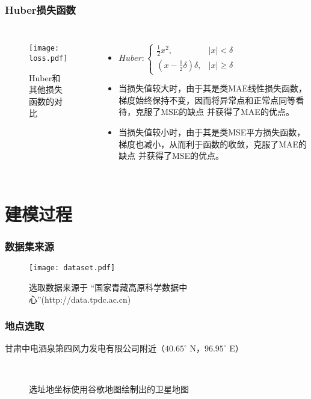 \documentclass[14pt, AutoFakeBold]{ppt}
\begin{document}
\begin{frame}
  \frametitle{Huber损失函数}
  \begin{columns}
    \begin{figure}[H]
      \centering
      \texttt{[image: loss.pdf]}
      \caption{Huber和其他损失函数的对比}
      \label{fig_loss}
    \end{figure}
      \begin{itemize}
      \item $Huber:
      \left\{\begin{matrix}
          \frac{1}{2}x^{2}, & \left | x  \right | < \delta\\
          (x - \frac1 2 \delta)\delta, & \left | x  \right | \geq \delta
      \end{matrix}\right.$
      \item 当损失值较大时，由于其是类MAE线性损失函数，
      梯度始终保持不变，因而将异常点和正常点同等看待，克服了MSE的缺点
      并获得了MAE的优点。
      \item 当损失值较小时，由于其是类MSE平方损失函数，
      梯度也减小，从而利于函数的收敛，克服了MAE的缺点
      并获得了MSE的优点。
    \end{itemize}
  \end{columns}
\end{frame}

\section{建模过程}

\begin{frame}
  \frametitle{数据集来源}
  \begin{figure}[H]
    \centering
    \texttt{[image: dataset.pdf]}
    \caption{选取数据来源于\cite{8028b944-daaa-4511-8769-965612652c49}
    \cite{37cab0ac-d066-4fb9-aa9c-1cf50d601096}
    “国家青藏高原科学数据中心”(http://data.tpdc.ac.cn)}
    \label{fig_dataset}
\end{figure}
\end{frame}

\begin{frame}
  \frametitle{地点选取}
  甘肃中电酒泉第四风力发电有限公司附近（$40.65^{\circ}$ N，$96.95^{\circ}$ E）
  \begin{figure}[H]
    \centering
    \\
    \caption{选址地坐标使用谷歌地图绘制出的卫星地图}
    \label{fig_google_maps}
\end{figure}
\end{frame}
\end{document}

